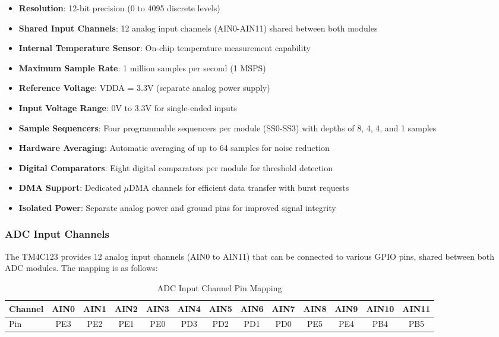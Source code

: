 \begin{itemize}[nosep]
  \item \textbf{Resolution}: 12-bit precision (0 to 4095 discrete levels)
  \item \textbf{Shared Input Channels}: 12 analog input channels (AIN0-AIN11) shared between both modules
  \item \textbf{Internal Temperature Sensor}: On-chip temperature measurement capability
  \item \textbf{Maximum Sample Rate}: 1 million samples per second (1 MSPS)
  \item \textbf{Reference Voltage}: VDDA = 3.3V (separate analog power supply)
  \item \textbf{Input Voltage Range}: 0V to 3.3V for single-ended inputs
  \item \textbf{Sample Sequencers}: Four programmable sequencers per module (SS0-SS3) with depths of 8, 4, 4, and 1 samples
  \item \textbf{Hardware Averaging}: Automatic averaging of up to 64 samples for noise reduction
  \item \textbf{Digital Comparators}: Eight digital comparators per module for threshold detection
  \item \textbf{DMA Support}: Dedicated $\mu$DMA channels for efficient data transfer with burst requests
  \item \textbf{Isolated Power}: Separate analog power and ground pins for improved signal integrity
\end{itemize}

\subsubsection{ADC Input Channels}
The TM4C123 provides 12 analog input channels (AIN0 to AIN11) that can be connected to various GPIO pins, shared between both ADC modules. The mapping is as follows:
\begin{table}[H]
\centering
\small
\begin{tabular}{l*{12}{c}}
\toprule
Channel & AIN0 & AIN1 & AIN2 & AIN3 & AIN4 & AIN5 & AIN6 & AIN7 & AIN8 & AIN9 & AIN10 & AIN11 \\
\midrule
Pin     & PE3  & PE2  & PE1  & PE0  & PD3  & PD2  & PD1  & PD0  & PE5  & PE4  & PB4   & PB5  \\
\bottomrule
\end{tabular}
\caption{ADC Input Channel Pin Mapping}
\end{table}

